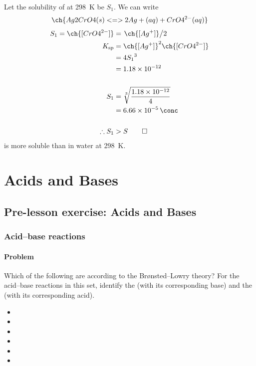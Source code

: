 \documentclass[12pt, a4paper, twoside]{pancake-book}
\newcommand*{\f}[2]{\frac{#1}{#2}}
\newcommand*{\slf}[2]{\slashfrac[auto]{#1}{#2}}
\begin{document}
Let the solubility of  at \qty{298}{\kelvin} be \(S_1\). We can write
\begin{equation}
	\ch{Ag2CrO4 (s) <=> 2 Ag+ (aq) + CrO4^{2-} (aq)}
	\label{eq:ag2cro4}
\end{equation}
\begin{align*}
	S_1 = \ch{[CrO4^{2-}]} & = \slf{\ch{[Ag^{+}]}}{2}           \\
	K_{\text{sp}}          & = \ch{[Ag^{+}]}^2 \ch{[CrO4^{2-}]} \\
	                       & = 4{S_1}^3                         \\
	                       & = \num{1.18e-12}                   \\
	\\
	S_1                    & = \sqrt[3]{\f{\num{1.18e-12}}{4}}  \\
	                       & = \qty{6.66e-5}{\conc}             \\
	\\
	\therefore S_1         & > S \qed
\end{align*}
{\color{accent}  is more soluble than  in water at \qty{298}{\kelvin}.}


\chapter{Acids and Bases}
\section{Pre-lesson exercise: Acids and Bases}
\subsection{Acid--base reactions}
\subsubsection{Problem}
Which of the following are 
according to the Brønsted--Lowry theory? For the acid--base
reactions in this set, identify the 
(with its corresponding base)
and the  (with its corresponding acid).

\begin{itemize}
	\item {}
	\item {}
	\item {}
	\item {}
	\item {}
	\item {}
\end{itemize}
\end{document}
